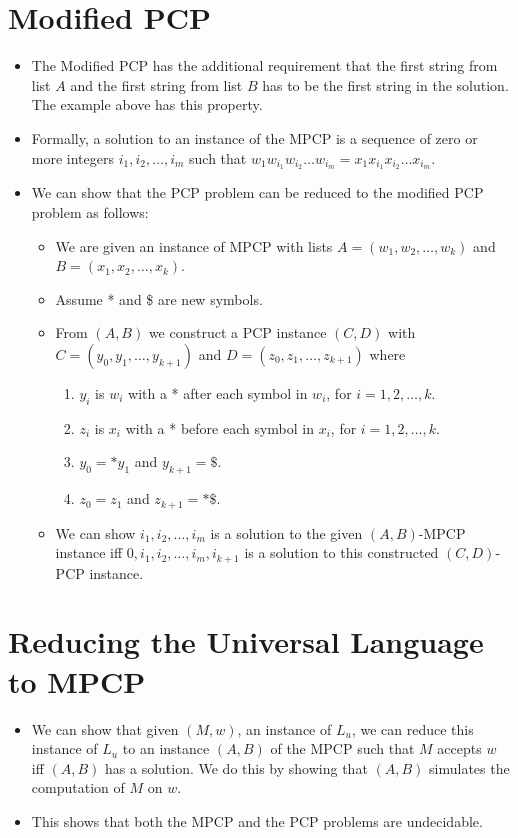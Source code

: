 \documentclass[]{article}
\begin{document}
\section{Modified PCP}
\begin{itemize}
\item The Modified PCP has the additional requirement that the first string from
list $A$ and the first string from list $B$ has to be the first string in the
solution. The example above has this property.
\item Formally, a solution to an instance of the MPCP is a sequence of zero or
more integers $i_1, i_2, \ldots, i_m$ such that
$w_1w_{i_1}w_{i_2}\ldots{w_{i_m}} = x_1x_{i_1}x_{i_2}\ldots{x_{i_m}}$.
\item We can show that the PCP problem can be reduced to the modified PCP
problem as follows:
\begin{itemize}
\item We are given an instance of MPCP with lists $A = (w_1,w_2, \ldots, w_k)$
and $B = (x_1,x_2,\ldots,x_k)$.
\item Assume * and \$ are new symbols.
\item From $(A,B)$ we construct a PCP instance $(C,D)$ with $C = (y_0, y_1,
\ldots, y_{k+1})$ and $D = (z_0,z_1,\ldots,z_{k+1})$ where
\begin{enumerate}
\item $y_i$ is $w_i$ with a * after each symbol in $w_i$, for $i = 1, 2,\ldots,
k$.
\item $z_i$ is $x_i$ with a * before each symbol in $x_i$, for $i = 1, 2,
\ldots, k$.
\item $y_0 = *y_1$ and $y_{k+1} = \$$.
\item $z_0 = z_1$ and $z_{k+1} = *\$$.
\end{enumerate}
\item We can show $i_1, i_2, \ldots, i_m$ is a solution to the given $(A,
B)$-MPCP instance iff $0, i_1, i_2, \ldots, i_m, i_{k+1}$ is a solution to this
constructed $(C,D)$-PCP instance.
\end{itemize}
\end{itemize}

\section{Reducing the Universal Language to MPCP}
\begin{itemize}
\item We can show that given $(M,w)$, an instance of $L_u$, we can reduce this
instance of $L_u$ to an instance $(A, B)$ of the MPCP such that $M$ accepts $w$
iff $(A, B)$ has a solution. We do this by showing that $(A, B)$ simulates the
computation of $M$ on $w$.
\item This shows that both the MPCP and the PCP problems are undecidable.
\end{itemize}
\end{document}
